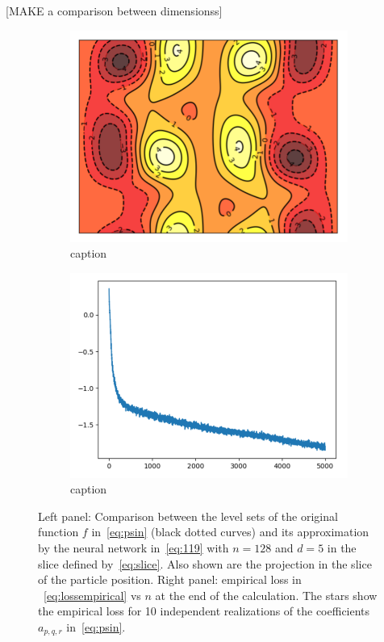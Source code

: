 \documentclass{article}
\begin{document}
 [MAKE a comparison between dimensionss]

\begin{figure}[H]
\begin{subfigure}{0.5\textwidth}
  \centering
  \includegraphics[width=0.8\linewidth]{images/Eijnden2018-heatmap-3dspin.png}
  \caption{ caption}
  \label{fig: description}
\end{subfigure}%
\begin{subfigure}{0.5\textwidth}
  \centering
  \includegraphics[width=0.8\linewidth]{images/Eijnden2018-loss.png}
  \caption{ caption}
  \label{fig:  description}
\end{subfigure}
\caption{Left panel: Comparison between the level sets of the original
  function $f$ in~\eqref{eq:psin} (black dotted curves) and its approximation
  by the neural network in~\eqref{eq:119} with $n= 128$ and $d=5$ in
  the slice defined by~\eqref{eq:slice}. Also shown are the projection
  in the slice of the particle position. Right panel: empirical loss in
  ~\eqref{eq:lossempirical} vs $n$ at the end of the calculation. The
  stars show the empirical loss for 10 independent
  realizations of the coefficients $a_{p,q,r}$ in~\eqref{eq:psin}.  }
\label{fig:  label}
\end{figure}
\end{document}

